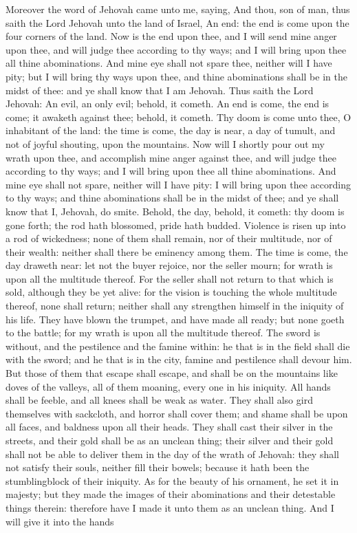 Moreover the word of Jehovah came unto me, saying, And thou, son of man, thus saith the Lord Jehovah unto the land of Israel, An end: the end is come upon the four corners of the land. Now is the end upon thee, and I will send mine anger upon thee, and will judge thee according to thy ways; and I will bring upon thee all thine abominations. And mine eye shall not spare thee, neither will I have pity; but I will bring thy ways upon thee, and thine abominations shall be in the midst of thee: and ye shall know that I am Jehovah.  Thus saith the Lord Jehovah: An evil, an only evil; behold, it cometh. An end is come, the end is come; it awaketh against thee; behold, it cometh. Thy doom is come unto thee, O inhabitant of the land: the time is come, the day is near, a day of tumult, and not of joyful shouting, upon the mountains. Now will I shortly pour out my wrath upon thee, and accomplish mine anger against thee, and will judge thee according to thy ways; and I will bring upon thee all thine abominations. And mine eye shall not spare, neither will I have pity: I will bring upon thee according to thy ways; and thine abominations shall be in the midst of thee; and ye shall know that I, Jehovah, do smite.  Behold, the day, behold, it cometh: thy doom is gone forth; the rod hath blossomed, pride hath budded. Violence is risen up into a rod of wickedness; none of them shall remain, nor of their multitude, nor of their wealth: neither shall there be eminency among them. The time is come, the day draweth near: let not the buyer rejoice, nor the seller mourn; for wrath is upon all the multitude thereof. For the seller shall not return to that which is sold, although they be yet alive: for the vision is touching the whole multitude thereof, none shall return; neither shall any strengthen himself in the iniquity of his life.  They have blown the trumpet, and have made all ready; but none goeth to the battle; for my wrath is upon all the multitude thereof. The sword is without, and the pestilence and the famine within: he that is in the field shall die with the sword; and he that is in the city, famine and pestilence shall devour him. But those of them that escape shall escape, and shall be on the mountains like doves of the valleys, all of them moaning, every one in his iniquity. All hands shall be feeble, and all knees shall be weak as water. They shall also gird themselves with sackcloth, and horror shall cover them; and shame shall be upon all faces, and baldness upon all their heads. They shall cast their silver in the streets, and their gold shall be as an unclean thing; their silver and their gold shall not be able to deliver them in the day of the wrath of Jehovah: they shall not satisfy their souls, neither fill their bowels; because it hath been the stumblingblock of their iniquity. As for the beauty of his ornament, he set it in majesty; but they made the images of their abominations and their detestable things therein: therefore have I made it unto them as an unclean thing. And I will give it into the hands 